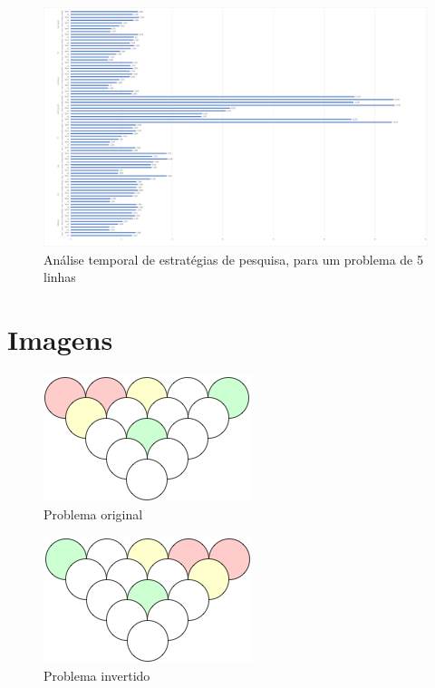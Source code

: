 \begin{figure}
    \centering
    \includegraphics[angle=-90,scale=0.3]{heuristics.png}
    \caption{Análise temporal de estratégias de pesquisa, para um problema de 5 linhas}
    \label{fig: searchstrategy}
\end{figure}
\clearpage
\section{Imagens}

\begin{figure}[!htb]
    \centering
    \includegraphics{puzzle.png}
    \caption{Problema original}
    \label{fig: originalproblem}
\end{figure}

\begin{figure}[!htb]
    \centering
    \includegraphics{puzzle_inverted.png}
    \caption{Problema invertido}
    \label{fig: invertedproblem}
\end{figure}

